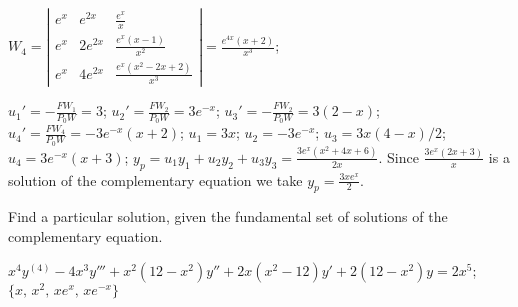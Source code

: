 \documentclass{ximera}
\begin{document}
\begin{problem}
\begin{solution}
$W_4=\left|\begin{array}{cccc}
e^x&e^{2x}&\frac{e^x}{x}\\
e^x&2e^{2x}&\frac{e^x(x-1)}{x^2}\\
e^x&4e^{2x}&\frac{e^x(x^2-2x+2)}{x^3}
\end{array}\right|=\frac{e^{4x}(x+2)}{x^3}$;

$u_1'=-\frac{FW_1}{P_0W}=3$;
$u_2'=\frac{FW_2}{P_0W}=3e^{-x}$;
$u_3'=-\frac{FW_2}{P_0W}=3(2-x)$;
$u_4'=\frac{FW_4}{P_0W}=-3e^{-x}(x+2)$;
$u_1=3x$;
$u_2=-3e^{-x}$;
$u_3=3x(4-x)/2$;
$u_4=3e^{-x}(x+3)$;
$y_p=u_1y_1+u_2y_2+u_3y_3=\frac{3e^x(x^2+4x+6)}{2x}$.
Since
$\frac{3e^x(2x+3)}{x}$ is a solution of the complementary
equation we take $y_p=\frac{3xe^x}{2}$.
\end{solution}
\end{problem}

\begin{problem}\label{exer:9.4.21}
Find a particular
solution, given the fundamental set of solutions of the complementary equation.

$x^4y^{(4)}-4x^3y'''+x^2(12-x^2)y''+2x(x^2-12)y'+2(12-x^2)y=2x^5$;
 $\{x,\,x^2,\,xe^x,\,xe^{-x}\}$
\end{problem}
\end{document}
